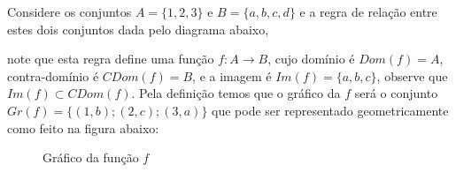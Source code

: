 \begin{exem}
 Considere os conjuntos $A= \{1, 2, 3\}$ e $B= \{a, b, c, d\}$ e a regra de relação entre estes dois conjuntos dada pelo diagrama abaixo,

 \begin{figure}[H]
 \centering
\end{figure}
note que esta regra define uma função $f: A \rightarrow B$, cujo domínio é $Dom(f) = A$, contra-domínio é $CDom(f) = B$, e a imagem é $Im(f)= \{a, b, c\}$, observe que $Im(f) \subset CDom(f)$. Pela definição temos que o gráfico da $f$ será o conjunto $Gr(f)= \{(1, b); (2, c); (3, a)\}$ que pode ser representado geometricamente como feito na figura abaixo:

\begin{figure}[H]
 \centering
    \caption{Gráfico da função $f$}
  \end{figure}

\end{exem}


